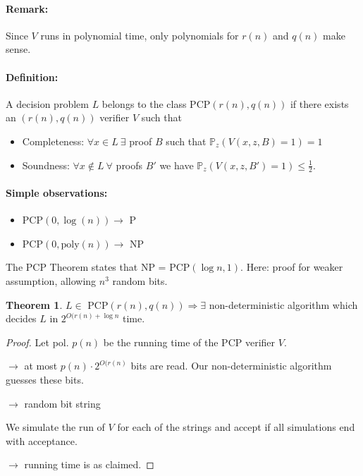 \documentclass[11pt]{article}
\theoremstyle{definition}
\newtheorem{theorem}{Theorem}[section]
\theoremstyle{definition}
\begin{document}
\paragraph{Remark:} Since $ V $ runs in polynomial time, only polynomials for $ r(n) $ and $ q(n) $ make sense.

\paragraph{Definition:} A decision problem $ L $ belongs to the class PCP$(r(n), q(n))$ if there exists an $(r(n), q(n))$ verifier $ V $ such that
\begin{itemize}
\item Completeness: $ \forall x \in L ~ \exists $ proof $ B $ such that $ \mathbb{P}_z(V(x, z, B) = 1) = 1 $
\item Soundness: $ \forall x \not \in L ~ \forall $ proofs $ B' $ we have $ \mathbb{P}_z(V(x, z, B') = 1) \leq \frac{1}{2} $.
\end{itemize}

\paragraph{Simple observations:}
\begin{itemize}
\item PCP$(0, \log(n)) \longrightarrow $ P
\item PCP$(0, \text{poly}(n)) \longrightarrow $ NP
\end{itemize}

The PCP Theorem states that NP = PCP$(\log n, 1)$. Here: proof for weaker assumption, allowing $ n^3 $ random bits.

\begin{theorem}
$ L \in $ PCP$(r(n), q(n)) \Rightarrow \exists $ non-deterministic algorithm which decides $ L $ in $ 2^{O(r(n) + \log n} $ time.
\end{theorem}
\begin{proof}
Let pol. $ p (n) $ be the running time of the PCP verifier $ V $.

$ \rightarrow $ at most $ p(n) \cdot 2^{O(r(n)} $ bits are read. Our non-deterministic algorithm guesses these bits.

$ \rightarrow $ random bit string

We simulate the run of $ V $ for each of the strings and accept if all simulations end with acceptance.

$ \rightarrow $ running time is as claimed.
\end{proof}
\end{document}
